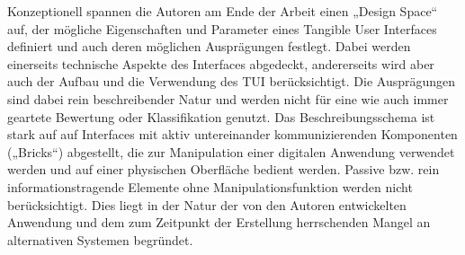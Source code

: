 Konzeptionell spannen die Autoren am Ende der Arbeit einen „Design Space“ auf, der mögliche Eigenschaften und Parameter eines Tangible User Interfaces definiert und auch deren möglichen Ausprägungen festlegt. Dabei werden einerseits technische Aspekte des Interfaces abgedeckt, andererseits wird aber auch der Aufbau und die Verwendung des \gls{TUI} berücksichtigt. Die Ausprägungen sind dabei rein beschreibender Natur und werden nicht für eine wie auch immer geartete Bewertung oder Klassifikation genutzt. Das Beschreibungsschema ist stark auf auf Interfaces mit aktiv untereinander kommunizierenden Komponenten („Bricks“) abgestellt, die zur Manipulation einer digitalen Anwendung verwendet werden und auf einer physischen Oberfläche bedient werden. Passive bzw. rein informationstragende Elemente ohne Manipulationsfunktion werden nicht berücksichtigt. Dies liegt in der Natur der von den Autoren entwickelten Anwendung und dem zum Zeitpunkt der Erstellung herrschenden Mangel an alternativen Systemen begründet.

